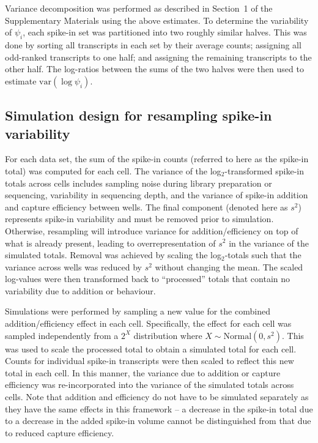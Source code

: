 \documentclass{article}
\begin{document}
Variance decomposition was performed as described in Section~1 of the Supplementary Materials using the above estimates.
To determine the variability of $\psi_i$, each spike-in set was partitioned into two roughly similar halves.
This was done by sorting all transcripts in each set by their average counts; assigning all odd-ranked transcripts to one half; and assigning the remaining transcripts to the other half.
The log-ratios between the sums of the two halves were then used to estimate $\mbox{var}(\log \psi_i)$.

\subsection{Simulation design for resampling spike-in variability}
For each data set, the sum of the spike-in counts (referred to here as the spike-in total) was computed for each cell.
The variance of the log$_2$-transformed spike-in totals across cells includes sampling noise during library preparation or sequencing, variability in sequencing depth, and the variance of spike-in addition and capture efficiency between wells.
The final component (denoted here as $s^2$) represents spike-in variability and must be removed prior to simulation.
Otherwise, resampling will introduce variance for addition/efficiency on top of what is already present, leading to overrepresentation of $s^2$ in the variance of the simulated totals.
Removal was achieved by scaling the log$_2$-totals such that the variance across wells was reduced by $s^2$ without changing the mean.
The scaled log-values were then transformed back to ``processed'' totals that contain no variability due to addition or behaviour.

Simulations were performed by sampling a new value for the combined addition/efficiency effect in each cell.
Specifically, the effect for each cell was sampled independently from a $2^X$ distribution where $X \sim \mbox{Normal}(0, s^2)$.
This was used to scale the processed total to obtain a simulated total for each cell.
Counts for individual spike-in transcripts were then scaled to reflect this new total in each cell.
In this manner, the variance due to addition or capture efficiency was re-incorporated into the variance of the simulated totals across cells.
Note that addition and efficiency do not have to be simulated separately as they have the same effects in this framework -- a decrease in the spike-in total due to a decrease in the added spike-in volume cannot be distinguished from that due to reduced capture efficiency.
\end{document}
